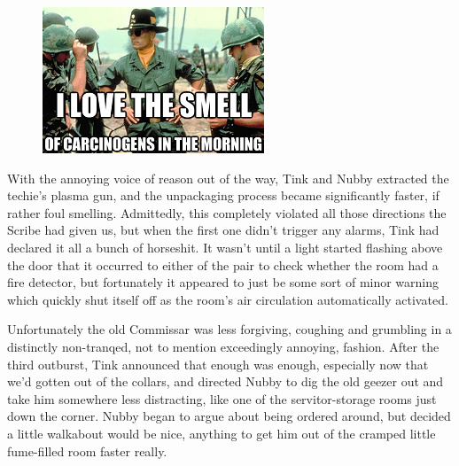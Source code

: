 \begin{figure}
	\begin{center}
		\includegraphics[width=\figwidth]{pics/21/77.png}
	\end{center}
\end{figure}
With the annoying voice of reason out of the way, Tink and Nubby extracted the techie's plasma gun, and the unpackaging process became significantly faster, if rather foul smelling. 
Admittedly, this completely violated all those directions the Scribe had given us, but when the first one didn't trigger any alarms, Tink had declared it all a bunch of horseshit. 
It wasn't until a light started flashing above the door that it occurred to either of the pair to check whether the room had a fire detector, but fortunately it appeared to just be some sort of minor warning which quickly shut itself off as the room's air circulation automatically activated. 


Unfortunately the old Commissar was less forgiving, coughing and grumbling in a distinctly non-tranqed, not to mention exceedingly annoying, fashion. 
After the third outburst, Tink announced that enough was enough, especially now that we'd gotten out of the collars, and directed Nubby to dig the old geezer out and take him somewhere less distracting, like one of the servitor-storage rooms just down the corner. 
Nubby began to argue about being ordered around, but decided a little walkabout would be nice, anything to get him out of the cramped little fume-filled room faster really.

